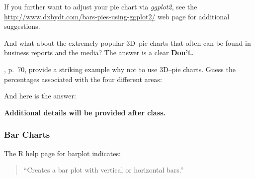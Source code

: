 \documentclass[12pt,letterpaper,final]{article}
\begin{document}
If you further want to adjust your pie chart via {\it ggplot2}, see the
\url{http://www.dxbydt.com/bars-pies-using-ggplot2/} 
web page for additional suggestions.


\newpage


And what about the extremely popular 3D--pie charts that often can be
found in business reports and the media? The answer is 
a clear {\bf Don't.}

\cite{WWPJH96}, p.~70, provide a striking example why not to
use 3D--pie charts. Guess the percentages associated
with the four different areas:


And here is the answer:

\if{}


\else
{\bf Additional details will be provided after class.}
\fi


\newpage


\subsubsection{Bar Charts}


The R help page for barplot indicates:
\begin{quotation}
``Creates a bar plot with vertical or horizontal bars.''
\end{quotation}
\end{document}
